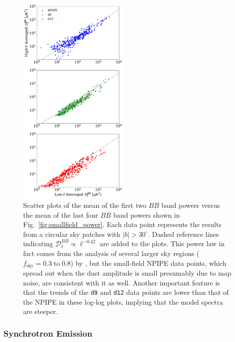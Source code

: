 \documentclass[twocolumn]{aastex631}
\begin{document}
\begin{figure}
    \centering
    \includegraphics[width=0.48\textwidth]{figures/all2_lhmean.pdf}
    \caption{Scatter plots of the mean of the first two $BB$ band powers versus the mean of the last four $BB$ band powers shown in Fig.~\ref{fig:smallfield_power}. Each data point represents the results from a circular sky patches with $|b| > 30^\circ$. Dashed reference lines indicating $\mathcal{D}_\ell^{BB} \propto \ell^{-0.42}$ are added to the plots. This power law in fact comes from the analysis of several larger sky regions ($f_\text{sky} = 0.3 \; \text{to} \; 0.8$) by \cite{planck2014-XXX}, but the small-field NPIPE data points, which spread out when the dust amplitude is small presumably due to map noise, are consistent with it as well. Another important feature is that the trends of the \texttt{d9} and \texttt{d12} data points are lower than that of the NPIPE in these log-log plots, implying that the model spectra are steeper.}
    \label{fig:smallfield_power_all}
\end{figure}

\subsubsection{Synchrotron Emission}
\end{document}
